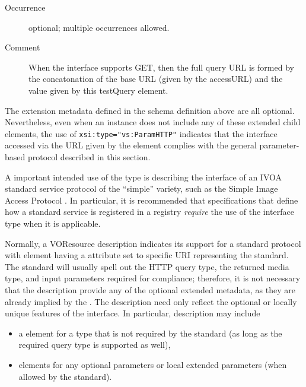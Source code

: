 \documentclass[11pt,a4paper]{ivoa}
\begin{document}
\begin{generated}
\begin{bigdescription}
\begin{description}
\item[Occurrence] optional; multiple occurrences allowed.
\item[Comment] 
                       When the interface supports GET, then the full 
                       query URL is formed by the concatonation of the 
                       base URL (given by the accessURL) and the value 
                       given by this testQuery element.  
                    

\end{description}


\end{bigdescription}\endgroup

\endgroup
\end{generated}


The extension metadata defined in the schema definition above are all
optional.  Nevertheless, even when an 
instance does not include any of these extended child elements, the
use of \verb|xsi:type="vs:ParamHTTP"| indicates that the interface
accessed via the URL given by the 
element complies with the general parameter-based protocol described
in this section.  






A important intended use of the  type is
describing the interface of an IVOA standard service protocol 
of the ``simple'' variety, such as the Simple Image Access Protocol
\citep{2015ivoa.spec.1223D}.  In particular, it is recommended that
specifications that define how a standard service is registered in a
registry \emph{require} the use of the 
interface type when it is applicable.



Normally, a VOResource
description indicates its support for a standard protocol with
 element having a
 attribute set to specific URI representing the
standard.  The standard will usually spell out the HTTP query type,
the returned media type, and input parameters required for compliance;
therefore, it is not necessary that the 
description provide any of the optional extended metadata, as they are
already implied by the .  The description need
only reflect the optional or locally unique features of the
interface.  In particular, description may include


\begin{itemize}
\item a  element for a type that is not
  required by the standard (as long as the required query type is
  supported as well),

\item {}\/ elements for any optional parameters
       or local extended parameters (when allowed by the standard).
\end{itemize}
\end{document}
